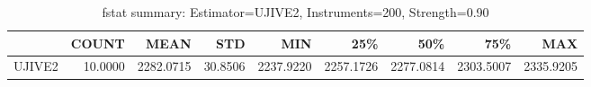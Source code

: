 \begin{table}[ht]
\centering
\caption{fstat summary: Estimator=UJIVE2, Instruments=200, Strength=0.90}
\begin{tabular}{lrrrrrrrr}
\toprule
 & COUNT & MEAN & STD & MIN & 25\% & 50\% & 75\% & MAX \\
\midrule
UJIVE2 & 10.0000 & 2282.0715 & 30.8506 & 2237.9220 & 2257.1726 & 2277.0814 & 2303.5007 & 2335.9205 \\
\bottomrule
\end{tabular}
\end{table}
